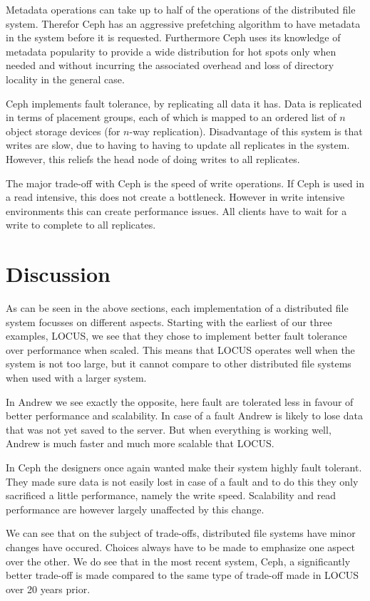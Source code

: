 \documentclass[a4paper,12px]{article}
\begin{document}
Metadata operations can take up to half of the operations of the distributed
file system. Therefor Ceph has an aggressive prefetching algorithm to have
metadata in the system before it is requested.  Furthermore Ceph uses its
knowledge of metadata popularity to provide a wide distribution for hot spots
only when needed and without incurring the associated overhead and loss of
directory locality in the general case.

Ceph implements fault tolerance, by replicating all data it has. Data is
replicated in terms of placement groups, each of which is mapped to an ordered
list of $n$ object storage devices (for $n$-way replication).
\citet{weil2006ceph} Disadvantage of this system is that writes are slow, due to
having to having to update all replicates in the system. However, this reliefs
the head node of doing writes to all replicates.

The major trade-off with Ceph is the speed of write operations. If Ceph is used
in a read intensive, this does not create a bottleneck. However in write
intensive environments this can create performance issues. All clients have to
wait for a write to complete to all replicates.

\section{Discussion}
As can be seen in the above sections, each implementation of a distributed file
system focusses on different aspects. Starting with the earliest of our three
examples, LOCUS, we see that they chose to implement better fault tolerance over
performance when scaled. This means that LOCUS operates well when the system is
not too large, but it cannot compare to other distributed file systems when used
with a larger system.

In Andrew we see exactly the opposite, here fault are tolerated less in favour
of better performance and scalability. In case of a fault Andrew is likely to
lose data that was not yet saved to the server. But when everything is working
well, Andrew is much faster and much more scalable that LOCUS.

In Ceph the designers once again wanted make their system highly fault tolerant.
They made sure data is not easily lost in case of a fault and to do this they
only sacrificed a little performance, namely the write speed. Scalability and
read performance are however largely unaffected by this change.

We can see that on the subject of trade-offs, distributed file systems have
minor changes have occured. Choices always have to be made to emphasize one
aspect over the other. We do see that in the most recent system, Ceph, a
significantly better trade-off is made compared to the same type of trade-off
made in LOCUS over 20 years prior.




\clearpage


\end{document}
